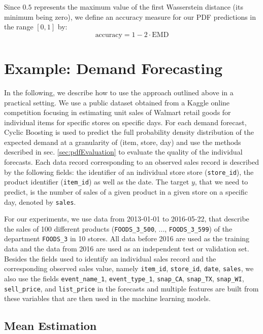 \documentclass[BCOR=1mm, DIV=calc,10pt,
twoside=true,
twocolumn,
headings=normal]{scrartcl}
\begin{document}
Since $0.5$ represents the maximum value of the first Wasserstein distance (its minimum being zero), we define an accuracy measure for our PDF predictions in the range $[0, 1]$ by:
\begin{equation}
\text{accuracy} = 1 - 2 \cdot \text{EMD}
\end{equation}


\section{Example: Demand Forecasting}
\label{sec:example}

In the following, we describe how to use the approach outlined above in a practical setting. We use a public dataset obtained from a Kaggle online competition focusing in estimating unit sales of Walmart retail goods \cite{kaggle_data} for individual items for specific stores on specific days. For each demand forecast, Cyclic Boosting is used to predict the full probability density distribution of the expected demand at a granularity of (item, store, day) and use the methods described in sec. \ref{sec:pdfEvaluation} to evaluate the quality of the individual forecasts. Each data record corresponding to an observed sales record is described by the following fields: the identifier of an individual store store (\texttt{store\_id}), the product identifier (\texttt{item\_id}) as well as the date. The target $y$, that we need to predict, is the number of sales of a given product in a given store on a specific day, denoted by \texttt{sales}.

For our experiments, we use data from 2013-01-01 to 2016-05-22, that describe the sales of 100 different products (\texttt{FOODS\_3\_500}, ..., \texttt{FOODS\_3\_599}) of the department \texttt{FOODS\_3} in 10 stores.  All data before 2016 are used as the training data and the data from 2016 are used as an independent test or validation set. Besides the fields used to identify an individual sales record and the corresponding observed sales value, namely \texttt{item\_id}, \texttt{store\_id}, \texttt{date}, \texttt{sales}, we also use the fields \texttt{event\_name\_1}, \texttt{event\_type\_1}, \texttt{snap\_CA}, \texttt{snap\_TX}, \texttt{snap\_WI}, \texttt{sell\_price}, and \texttt{list\_price} in the forecasts and multiple features are built from these variables that are then used in the machine learning models.

\subsection{Mean Estimation}
\label{sec:example_mean}
\end{document}
